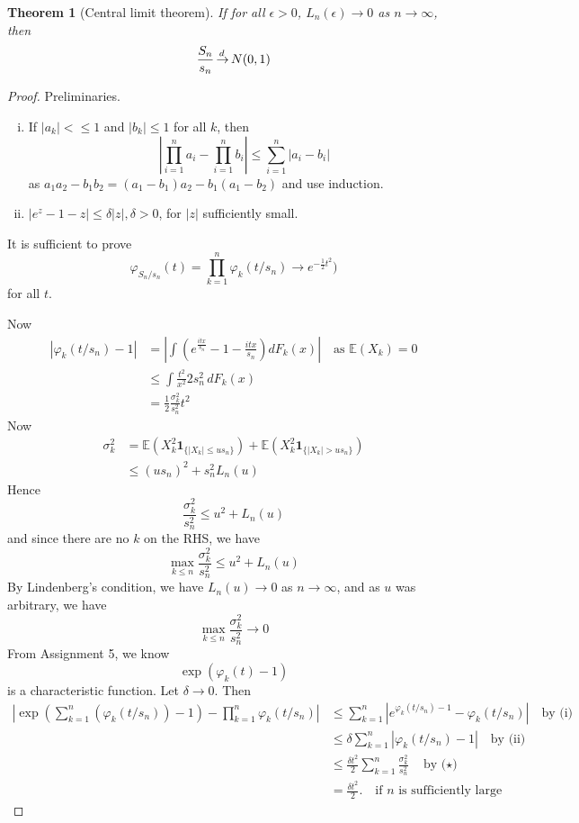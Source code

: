 \documentclass[10pt, oneside, reqno]{amsart}
\theoremstyle{plain}%
\newtheorem{thm}{Theorem}[section]
\theoremstyle{definition}
\theoremstyle{remark}
\renewcommand{\phi}{\varphi}
\newcommand{\E}{\mathbb{E}}
\def\cid{\,{\buildrel \!d \over \rightarrow}\,}
\newcommand{\indic}[1]{\mathbf{1}_{\{ #1 \}} }
\begin{document}
\begin{thm}[Central limit theorem]
	If for all $\epsilon > 0$, $L_n(\epsilon) \rightarrow 0$ as $n \rightarrow \infty$, then \[
		\frac{S_n}{s_n} \cid N(0, 1)
	\]
\end{thm}
\begin{proof}
	Preliminaries.
	\begin{enumerate}[(i)]
		\item If $|a_k| <\leq 1$ and $|b_k| \leq 1$ for all $k$, then \[
			\left| \prod_{i=1}^n a_i - \prod_{i=1}^n b_i \right| \leq \sum_{i=1}^n |a_i - b_i| 
		\] as $a_1 a_2 - b_1 b_2 = (a_1 - b_1) a_2 - b_1(a_1 - b_2)$ and use induction.  
		\item $\left|e^z - 1 - z \right| \leq \delta |z|, \delta > 0$, for $|z|$ sufficiently small.   
	\end{enumerate}
	
	It is sufficient to prove \[
		\phi_{S_n/s_n}(t) = \prod_{k=1}^n \phi_k(t/s_n) \rightarrow e^{-\frac{1}{2}t^2} \tag{$\ddag$})
	\] for all $t$.
	
	Now \begin{align*}
		|\phi_k(t/s_n) - 1| &= \left| \int (e^{\frac{itx}{s_n}} - 1 - \frac{itx}{s_n})dF_k(x) \right| \quad \text{as $\E(X_k) = 0$} \\
		&\leq \int \frac{t^2}{x^2}{2 s_n^2} \, dF_k(x) \\
		&= \frac{1}{2}\frac{\sigma_k^2}{s_n^2}t^2 \tag{$\star$}
	\end{align*}  Now \begin{align*}
		\sigma_k^2 &= \E(X_k^2 \indic{|X_k| \leq u s_n}) + \E(X_k^2 \indic{|X_k| >  u s_n}) \\
		&\leq (u s_n)^2 + s_n^2 L_n(u) 
	\end{align*} Hence \[
		\frac{\sigma_k^2}{s_n^2} \leq u^2 + L_n(u)
	\] and since there are no $k$ on the RHS, we have \[
		\max_{k \leq n} \frac{\sigma_k^2}{s_n^2} \leq u^2 + L_n(u)
	\]  By Lindenberg's condition, we have $L_n(u) \rightarrow 0$ as $n \rightarrow \infty$, and as $u$ was arbitrary, we have \[
		\max_{k \leq n} \frac{\sigma^2_k}{s_n^2} \rightarrow 0
	\] From Assignment 5, we know \[
		\exp(\phi_k(t) - 1)
	\] is a characteristic function.  Let $\delta \rightarrow 0$.  Then \begin{align*}
		\left| \exp(\sum_{k=1}^n (\phi_k(t/s_n)) - 1) - \prod_{k=1}^n \phi_k(t/s_n) \right| &\leq \sum_{k=1}^n \left| e^{\phi_k(t/s_n) - 1} - \phi_k(t/s_n) \right| \quad \text{by (i)} \\
		&\leq \delta \sum_{k=1}^n \left|\phi_k(t/s_n) - 1 \right| \quad \text{by (ii)} \\
		&\leq \frac{\delta t^2}{2}{\sum_{k=1}^n \frac{\sigma_k^2}{s_n^2}} \quad \text{by ($\star$)} \\
		&= \frac{\delta t^2}{2}. \quad \text{if $n$ is sufficiently large}
	\end{align*}
	

\end{proof}
\end{document}
